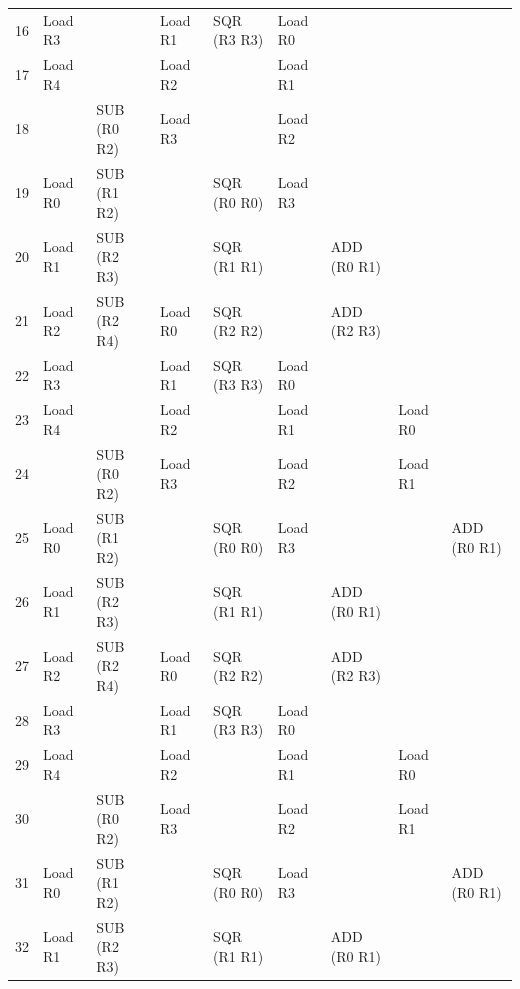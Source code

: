 \begin{table}[tb]
{\begin{tabular}{lllllllll}
			16    & Load R3 &               & Load R1 & SQR (R3 R3)   & Load R0 &               &         &  \\
			17    & Load R4 &               & Load R2 &               & Load R1 &               &         &  \\
			18    &         & SUB (R0 R2)   & Load R3 &               & Load R2 &               &         &  \\
			19    & Load R0 & SUB (R1 R2)   &         & SQR (R0 R0)   & Load R3 &               &         &  \\
			20    & Load R1 & SUB (R2 R3)   &         & SQR (R1 R1)   &         & ADD (R0 R1)   &         &  \\
			21    & Load R2 & SUB (R2 R4)   & Load R0 & SQR (R2 R2)   &         & ADD (R2 R3)   &         &  \\
			22    & Load R3 &               & Load R1 & SQR (R3 R3)   & Load R0 &               &         &  \\
			23    & Load R4 &               & Load R2 &               & Load R1 &               & Load R0 &  \\
			24    &         & SUB (R0 R2)   & Load R3 &               & Load R2 &               & Load R1 &  \\
			25    & Load R0 & SUB (R1 R2)   &         & SQR (R0 R0)   & Load R3 &               &         & ADD (R0 R1)   \\
			26    & Load R1 & SUB (R2 R3)   &         & SQR (R1 R1)   &         & ADD (R0 R1)   &         &  \\
			27    & Load R2 & SUB (R2 R4)   & Load R0 & SQR (R2 R2)   &         & ADD (R2 R3)   &         &  \\
			28    & Load R3 &               & Load R1 & SQR (R3 R3)   & Load R0 &               &         &  \\
			29    & Load R4 &               & Load R2 &               & Load R1 &               & Load R0 &  \\
			30    &         & SUB (R0 R2)   & Load R3 &               & Load R2 &               & Load R1 &  \\
			31    & Load R0 & SUB (R1 R2)   &         & SQR (R0 R0)   & Load R3 &               &         & ADD (R0 R1)   \\
			32    & Load R1 & SUB (R2 R3)   &         & SQR (R1 R1)   &         & ADD (R0 R1)   &         &  \\ \bottomrule
		\end{tabular}
	}
\end{table}

